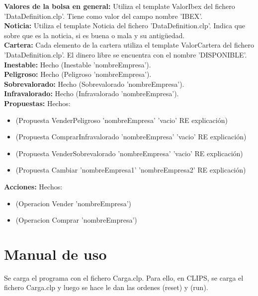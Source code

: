 \textbf{Valores de la bolsa en general:} Utiliza el template ValorIbex del fichero 'DataDefinition.clp'. Tiene como valor del campo nombre 'IBEX'.\\

\textbf{Noticia:} Utiliza el template Noticia del fichero 'DataDefinition.clp'. Indica que sobre que es la noticia, si es buena o mala y su antigüedad.\\

\textbf{Cartera:} Cada elemento de la cartera utiliza el template ValorCartera del fichero 'DataDefinition.clp'. El dinero libre se encuentra con el nombre 'DISPONIBLE'.\\

\textbf{Inestable:} Hecho (Inestable 'nombreEmpresa').\\

\textbf{Peligroso:} Hecho (Peligroso 'nombreEmpresa').\\

\textbf{Sobrevalorado:} Hecho (Sobrevalorado 'nombreEmpresa').\\

\textbf{Infravalorado:} Hecho (Infravalorado 'nombreEmpresa').\\

\textbf{Propuestas:} Hechos:
\begin{itemize}
\item (Propuesta VenderPeligroso 'nombreEmpresa' 'vacio' RE explicación)
\item (Propuesta ComprarInfravalorado 'nombreEmpresa' 'vacio' RE explicación)
\item (Propuesta VenderSobrevalorado 'nombreEmpresa' 'vacio' RE explicación)
\item (Propuesta Cambiar 'nombreEmpresa1' 'nombreEmpresa2' RE explicación)
\end{itemize}

\textbf{Acciones:} Hechos:
\begin{itemize}
\item (Operacion Vender 'nombreEmpresa')
\item (Operacion Comprar 'nombreEmpresa')
\end{itemize}
\newpage
\section{Manual de uso}

Se carga el programa con el fichero Carga.clp. Para ello, en CLIPS, se carga el fichero Carga.clp y luego se hace le dan las ordenes (reset) y (run).\\

